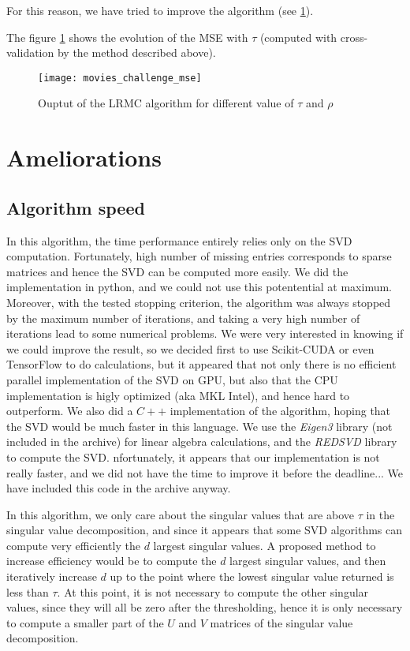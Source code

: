 \documentclass[a4paper, 11pt]{article}
\newcommand{\name}[1]{\emph{#1}}
\begin{document}
For this reason, we have tried to improve the algorithm (see
\ref{sec:ameliorations}).


The figure \ref{fig:movies_challenge_mse} shows the evolution of the
MSE with $\tau$ (computed with cross-validation by the method
described above).
\begin{figure}[h]
  \centering
  \texttt{[image: movies\_challenge\_mse]}
  \caption{Ouptut of the LRMC algorithm for different value of $\tau$ and
    $\rho$}\label{fig:movies_challenge_mse}
\end{figure}


\section{Ameliorations}
\label{sec:ameliorations}



\subsection{Algorithm speed}

In this algorithm, the time performance entirely relies only on the
SVD computation. Fortunately, high number of missing entries
corresponds to sparse matrices and hence the SVD can be computed more
easily.  We did the implementation in python, and we could not use
this potentential at maximum. Moreover, with the tested stopping
criterion, the algorithm was always stopped by the maximum number of
iterations, and taking a very high number of iterations lead to some
numerical problems.  We were very interested in knowing if we could
improve the result, so we decided first to use Scikit-CUDA or even
TensorFlow to do calculations, but it appeared that not only there is
no efficient parallel implementation of the SVD on GPU, but also that
the CPU implementation is higly optimized (aka MKL Intel), and hence
hard to outperform. We also did a $C++$ implementation of the
algorithm, hoping that the SVD would be much faster in this
language. We use the \name{Eigen3} library (not included in the
archive) for linear algebra calculations, and the \name{REDSVD}
library to compute the SVD.  nfortunately, it appears that our
implementation is not really faster, and we did not have the time to
improve it before the deadline... We have included this code in the
archive anyway.

In this algorithm, we only care about the singular values that are
above $\tau$ in the singular value decomposition, and since it appears
that some SVD algorithms can compute very efficiently the $d$ largest
singular values. A proposed method \cite{svt} to increase efficiency
would be to compute the $d$ largest singular values, and then
iteratively increase $d$ up to the point where the lowest singular
value returned is less than $\tau$. At this point, it is not necessary
to compute the other singular values, since they will all be zero
after the thresholding, hence it is only necessary to compute a
smaller part of the $U$ and $V$ matrices of the singular value
decomposition.
\end{document}
